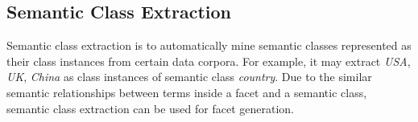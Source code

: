 

\subsection{Semantic Class Extraction}
Semantic class extraction is to automatically mine semantic classes represented as their class instances from certain data corpora. For example, it may extract \textit{USA}, \textit{UK}, \textit{China} as class instances of semantic class \textit{country}. Due to the similar semantic relationships between terms inside a facet and a semantic class, semantic class extraction can be used for facet generation. 

